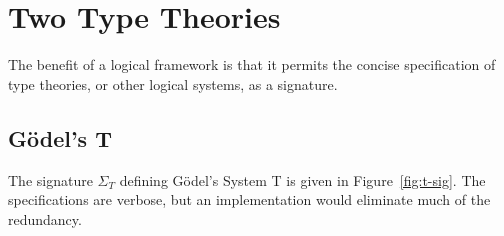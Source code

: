 \documentclass[11pt,twoside]{article}
\newcommand{\parens}[1]{(#1)}
\newcommand{\const}[1]{\text{#1}}
\newcommand{\arrclass}[2]{{#1}\to{#2}}
\newcommand{\appobj}[2]{{#1}\,{#2}}
\begin{document}
\section{Two Type Theories}

The benefit of a logical framework is that it permits the concise specification of type
theories, or other logical systems, as a signature.

\subsection{G\"odel's T}

\newcommand{\tpsort}{\const{tp}}
\newcommand{\nattp}{\const{nat}}
\newcommand{\arrtp}{\const{arr}}
\newcommand{\arrof}[2]{\appobj{\appobj{\arrtp}{#1}}{#2}}

\newcommand{\elfam}{\const{el}}
\newcommand{\elof}[1]{\appobj{\elfam}{#1}}
\newcommand{\elofp}[1]{\appobj{\elfam}{\parens{#1}}}

\newcommand{\zerocon}{\const{zero}}
\newcommand{\succcon}{\const{succ}}
\newcommand{\succof}[1]{\appobj{\succcon}{#1}}
\newcommand{\reccon}{\const{rec}}
\newcommand{\recof}[4]{\appobj{\appobj{\appobj{\appobj{\reccon}{#1}}{#2}}{#3}}{#4}}

\newcommand{\lamcon}{\const{lam}}
\newcommand{\lamof}[3]{\appobj{\appobj{\appobj{\lamcon}{#1}}{#2}}{#3}}
\newcommand{\appcon}{\const{app}}
\newcommand{\appof}[4]{\appobj{\appobj{\appobj{\appobj{\appcon}{#1}}{#2}}{#3}}{#4}}

\newcommand{\reczcon}{\const{nat-$\beta$-z}}
\newcommand{\recscon}{\const{nat-$\beta$-s}}
\newcommand{\betacon}{\const{arr-$\beta$}}
\newcommand{\etacon}{\const{arr-$\eta$}}

The signature $\Sigma_{T}$ defining G\"{o}del's System T is given in Figure~\ref{fig:t-sig}.
The specifications are verbose, but an implementation would eliminate much of the
redundancy.

\begin{comment}
In particular the outermost quantifiers on the classes of constants can be
safely omitted when their class is evident.  For example, it would be sensible to drop the
quantification over objects of sort $\tpsort$ in Figure~\ref{fig:t-sig}.  For example, the
declaration of $\lamcon$ could be abbreviated to
\begin{align*}
  \lamcon & : \arrclass{\parens{\arrclass{\elof{A_{1}}}{\elof{A_{2}}}}}{\elofp{\arrof{A_{1}}{A_{2}}}},
\end{align*}
with the outermost quantification over $A_{1}$ and $A_{2}$ of sort $\tpsort$ being
understood.  Correspondinly, it would be sensible to write $\lamof{\_{}}{\_{}}{F}$ when
the class of $F$ is given as $\arrclass{\elof{A_{1}}}{\elof{A_{2}}}$, the omitted
arguments being inferrable from context.  An abbreviated form of $\Sigma_{T}$ is given in
Figure~\ref{fig:t-sig-abbr} for comparison.
\end{comment}
\end{document}
